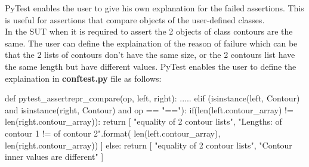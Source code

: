 PyTest enables the user to give his own explanation for the failed assertions. This is useful for assertions that compare objects of the user-defined classes. \\
In the SUT when it is required to assert the 2 objects of class contours are the same. The user can define the explaination of the reason of failure which can be that the 2 lists of contours don't have the same size, or the 2 contours list have the same length but have different values. PyTest enables the user to define the explaination in \textbf{conftest.py} file as follows: \\

\begin{python}
def pytest_assertrepr_compare(op, left, right):
    .....
    elif (isinstance(left, Contour) and isinstance(right, Contour)
    and op == "=="):
        if(len(left.contour_array) != len(right.contour_array)):
            return [
                "equality of 2 contour lists",
                "Lengths: {} of contour 1 != {} of contour 2".format(
                len(left.contour_array), len(right.contour_array))
            ]
        else:
            return [
                "equality of 2 contour lists",
                "Contour inner values are different"
            ]
\end{python}